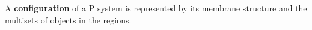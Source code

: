 A {\bf configuration} of a P system is represented by its membrane structure and the multisets of objects in the regions.